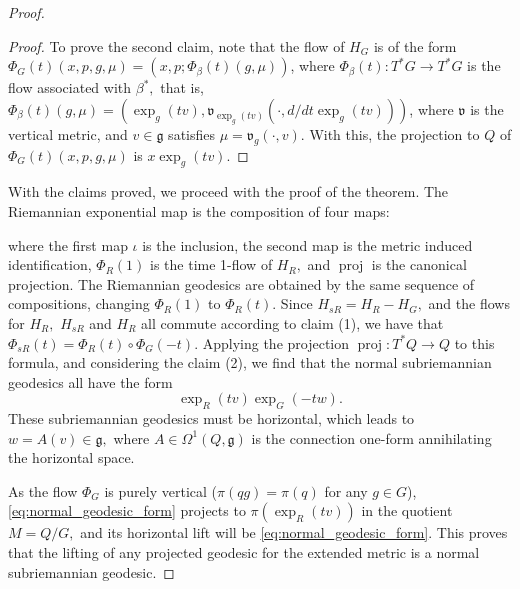 \documentclass[12pt, letterpaper, reqno]{amsart}
\theoremstyle{definition}
\theoremstyle{plain}
\theoremstyle{remark}
\begin{document}
\begin{proof}
\begin{proof}
		To prove the second claim, note that the flow of $ H_G $ is of the form $\Phi_G(t)(x,p,g,\mu)= (x,p; \Phi_\beta(t)(g,\mu))$, where $ \Phi_\beta(t): T^*G \rightarrow T^*G$ is the flow associated with $ \beta^*, $ that is, $ \Phi_\beta(t)(g,\mu)=( \operatorname{exp}_g(tv), \mathfrak{v}_{ \operatorname{exp}_g(tv) }(\cdot, d/dt \operatorname{exp}_g(tv) ) ) $, where $ \mathfrak{v} $ is the vertical metric, and $ v \in \mathfrak{g} $ satisfies $ \mu = \mathfrak{v}_g(\cdot,v). $ With this, the projection to $ Q $ of $ \Phi_G(t)(x,p,g,\mu) $ is $ x \operatorname{exp}_g(tv). $  
	\end{proof}
	With the claims proved, we proceed with the proof of the theorem. The Riemannian exponential map is the composition of four maps:
	\begin{center}
	\end{center}
	where the first map $ \iota $ is the inclusion, the second map is the metric induced identification, $ \Phi_R(1) $ is the time 1-flow of $ H_R, $ and $ \operatorname{proj}  $ is the canonical projection. The Riemannian geodesics are obtained by the same sequence of compositions, changing $ \Phi_R(1) $ to $ \Phi_R(t). $ Since $ H_{sR} = H_R - H_G, $ and the flows for $ H_R, $ $ H_{sR} $ and $ H_R $ all commute according to claim (1), we have that $ \Phi_{sR}(t)= \Phi_R(t)\circ \Phi_G(-t). $  Applying the projection $ \operatorname{proj} :T^*Q \rightarrow Q $ to this formula, and considering the claim (2), we find that the normal subriemannian geodesics all have the form 
	\begin{equation}\label{eq:normal_geodesic_form}
		\operatorname{exp}_R(tv)  \operatorname{exp}_G(-tw).
	\end{equation}
	These subriemannian geodesics must be horizontal, which leads to $ w=A(v)\in \mathfrak{g}, $ where $A\in \Omega^1(Q, \mathfrak{g})$ is the connection one-form annihilating the horizontal space.

	As the flow $ \Phi_G $ is purely vertical ($\pi(qg)=\pi(q)$ for any $ g\in G $), \eqref{eq:normal_geodesic_form} projects to $ \pi( \operatorname{exp}_R(tv)) $ in the quotient $ M=Q/G, $ and its horizontal lift will be \eqref{eq:normal_geodesic_form}. This proves that the lifting of any projected geodesic for the extended metric is a normal subriemannian geodesic.


\end{proof}
\end{document}
